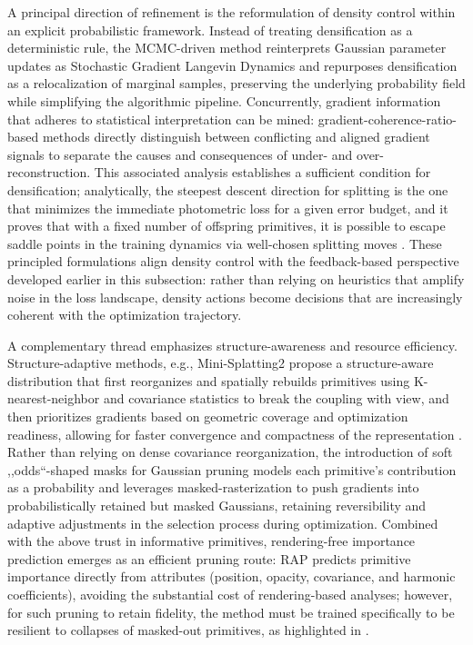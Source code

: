 \documentclass[11pt,a4paper]{article}
\begin{document}
A principal direction of refinement is the reformulation of density control within an explicit probabilistic framework. Instead of treating densification as a deterministic rule, the MCMC-driven method \cite{arxiv:2404.09591v3} reinterprets Gaussian parameter updates as Stochastic Gradient Langevin Dynamics and repurposes densification as a relocalization of marginal samples, preserving the underlying probability field while simplifying the algorithmic pipeline. Concurrently, gradient information that adheres to statistical interpretation can be mined: gradient-coherence-ratio-based methods \cite{arxiv:2508.09239v2} directly distinguish between conflicting and aligned gradient signals to separate the causes and consequences of under- and over-reconstruction. This associated analysis \cite{arxiv:2505.05587v1} establishes a sufficient condition for densification; analytically, the steepest descent direction for splitting is the one that minimizes the immediate photometric loss for a given error budget, and it proves that with a fixed number of offspring primitives, it is possible to escape saddle points in the training dynamics via well-chosen splitting moves \cite{arxiv:2505.05587v1}. These principled formulations align density control with the feedback-based perspective developed earlier in this subsection: rather than relying on heuristics that amplify noise in the loss landscape, density actions become decisions that are increasingly coherent with the optimization trajectory.

A complementary thread emphasizes structure-awareness and resource efficiency. Structure-adaptive methods, e.g., Mini-Splatting2 \cite{arxiv:2603.20857v1} propose a structure-aware distribution that first reorganizes and spatially rebuilds primitives using K-nearest-neighbor and covariance statistics to break the coupling with view, and then prioritizes gradients based on geometric coverage and optimization readiness, allowing for faster convergence and compactness of the representation \cite{arxiv:2603.20857v1}. Rather than relying on dense covariance reorganization, the introduction of soft ,,odds``-shaped masks for Gaussian pruning \cite{arxiv:2412.20522v3} models each primitive's contribution as a probability and leverages masked-rasterization to push gradients into probabilistically retained but masked Gaussians, retaining reversibility and adaptive adjustments in the selection process during optimization. Combined with the above trust in informative primitives, rendering-free importance prediction emerges as an efficient pruning route: RAP \cite{arxiv:2602.19753v1} predicts primitive importance directly from attributes (position, opacity, covariance, and harmonic coefficients), avoiding the substantial cost of rendering-based analyses; however, for such pruning to retain fidelity, the method must be trained specifically to be resilient to collapses of masked-out primitives, as highlighted in \cite{arxiv:2602.19753v1}.
\end{document}
